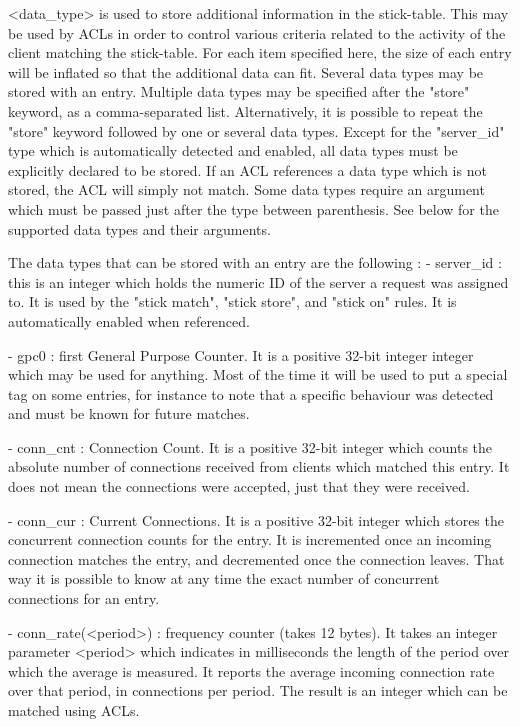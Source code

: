    <data_type> is used to store additional information in the stick-table. This
               may be used by ACLs in order to control various criteria related
               to the activity of the client matching the stick-table. For each
               item specified here, the size of each entry will be inflated so
               that the additional data can fit. Several data types may be
               stored with an entry. Multiple data types may be specified after
               the "store" keyword, as a comma-separated list. Alternatively,
               it is possible to repeat the "store" keyword followed by one or
               several data types. Except for the "server_id" type which is
               automatically detected and enabled, all data types must be
               explicitly declared to be stored. If an ACL references a data
               type which is not stored, the ACL will simply not match. Some
               data types require an argument which must be passed just after
               the type between parenthesis. See below for the supported data
               types and their arguments.

  The data types that can be stored with an entry are the following :
    - server_id : this is an integer which holds the numeric ID of the server a
      request was assigned to. It is used by the "stick match", "stick store",
      and "stick on" rules. It is automatically enabled when referenced.

    - gpc0 : first General Purpose Counter. It is a positive 32-bit integer
      integer which may be used for anything. Most of the time it will be used
      to put a special tag on some entries, for instance to note that a
      specific behaviour was detected and must be known for future matches.

    - conn_cnt : Connection Count. It is a positive 32-bit integer which counts
      the absolute number of connections received from clients which matched
      this entry. It does not mean the connections were accepted, just that
      they were received.

    - conn_cur : Current Connections. It is a positive 32-bit integer which
      stores the concurrent connection counts for the entry. It is incremented
      once an incoming connection matches the entry, and decremented once the
      connection leaves. That way it is possible to know at any time the exact
      number of concurrent connections for an entry.

    - conn_rate(<period>) : frequency counter (takes 12 bytes). It takes an
      integer parameter <period> which indicates in milliseconds the length
      of the period over which the average is measured. It reports the average
      incoming connection rate over that period, in connections per period. The
      result is an integer which can be matched using ACLs.

